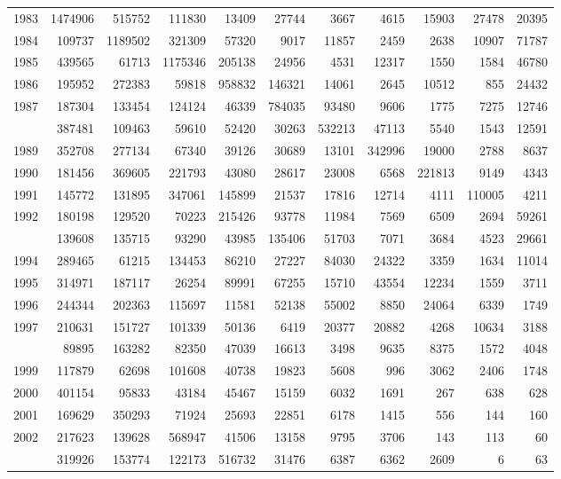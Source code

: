 \documentclass[
]{article}
\begin{document}
\begin{longtable}[t]{lrrrrrrrrrr}
1983 & 1474906 & 515752 & 111830 & 13409 & 27744 & 3667 & 4615 & 15903 & 27478 & 20395\\
1984 & 109737 & 1189502 & 321309 & 57320 & 9017 & 11857 & 2459 & 2638 & 10907 & 71787\\
1985 & 439565 & 61713 & 1175346 & 205138 & 24956 & 4531 & 12317 & 1550 & 1584 & 46780\\
1986 & 195952 & 272383 & 59818 & 958832 & 146321 & 14061 & 2645 & 10512 & 855 & 24432\\
1987 & 187304 & 133454 & 124124 & 46339 & 784035 & 93480 & 9606 & 1775 & 7275 & 12746\\
\addlinespace
1988 & 387481 & 109463 & 59610 & 52420 & 30263 & 532213 & 47113 & 5540 & 1543 & 12591\\
1989 & 352708 & 277134 & 67340 & 39126 & 30689 & 13101 & 342996 & 19000 & 2788 & 8637\\
1990 & 181456 & 369605 & 221793 & 43080 & 28617 & 23008 & 6568 & 221813 & 9149 & 4343\\
1991 & 145772 & 131895 & 347061 & 145899 & 21537 & 17816 & 12714 & 4111 & 110005 & 4211\\
1992 & 180198 & 129520 & 70223 & 215426 & 93778 & 11984 & 7569 & 6509 & 2694 & 59261\\
\addlinespace
1993 & 139608 & 135715 & 93290 & 43985 & 135406 & 51703 & 7071 & 3684 & 4523 & 29661\\
1994 & 289465 & 61215 & 134453 & 86210 & 27227 & 84030 & 24322 & 3359 & 1634 & 11014\\
1995 & 314971 & 187117 & 26254 & 89991 & 67255 & 15710 & 43554 & 12234 & 1559 & 3711\\
1996 & 244344 & 202363 & 115697 & 11581 & 52138 & 55002 & 8850 & 24064 & 6339 & 1749\\
1997 & 210631 & 151727 & 101339 & 50136 & 6419 & 20377 & 20882 & 4268 & 10634 & 3188\\
\addlinespace
1998 & 89895 & 163282 & 82350 & 47039 & 16613 & 3498 & 9635 & 8375 & 1572 & 4048\\
1999 & 117879 & 62698 & 101608 & 40738 & 19823 & 5608 & 996 & 3062 & 2406 & 1748\\
2000 & 401154 & 95833 & 43184 & 45467 & 15159 & 6032 & 1691 & 267 & 638 & 628\\
2001 & 169629 & 350293 & 71924 & 25693 & 22851 & 6178 & 1415 & 556 & 144 & 160\\
2002 & 217623 & 139628 & 568947 & 41506 & 13158 & 9795 & 3706 & 143 & 113 & 60\\
\addlinespace
2003 & 319926 & 153774 & 122173 & 516732 & 31476 & 6387 & 6362 & 2609 & 6 & 63\\

\end{longtable}
\end{document}
